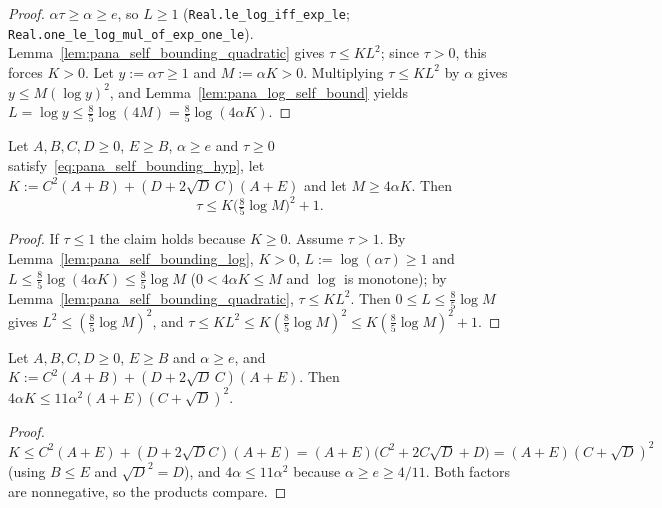 \begin{proof}
\leanok
$\alpha\tau \ge \alpha \ge e$, so $L \ge 1$ (\texttt{Real.le\_log\_iff\_exp\_le};
\texttt{Real.one\_le\_log\_mul\_of\_exp\_one\_le}). Lemma~\ref{lem:pana_self_bounding_quadratic}
gives $\tau \le KL^2$; since $\tau > 0$, this forces $K > 0$. Let $y := \alpha\tau \ge 1$ and
$M := \alpha K > 0$. Multiplying $\tau \le KL^2$ by $\alpha$ gives $y \le M(\log y)^2$, and
Lemma~\ref{lem:pana_log_self_bound} yields $L = \log y \le \frac85\log(4M) = \frac85\log(4\alpha K)$.
\end{proof}

\begin{lemma}\label{lem:pana_self_bounding_core}
\leanok
Let $A, B, C, D \ge 0$, $E \ge B$, $\alpha \ge e$ and $\tau \ge 0$
satisfy~\eqref{eq:pana_self_bounding_hyp}, let $K := C^2(A + B) + (D + 2\sqrt D\,C)(A + E)$ and
let $M \ge 4\alpha K$. Then
\[
  \tau \le K\Big(\tfrac85\log M\Big)^2 + 1 .
\]
\end{lemma}

\begin{proof}
\leanok
If $\tau \le 1$ the claim holds because $K \ge 0$. Assume $\tau > 1$. By
Lemma~\ref{lem:pana_self_bounding_log}, $K > 0$, $L := \log(\alpha\tau) \ge 1$ and
$L \le \frac85\log(4\alpha K) \le \frac85\log M$ ($0 < 4\alpha K \le M$ and $\log$ is monotone);
by Lemma~\ref{lem:pana_self_bounding_quadratic}, $\tau \le KL^2$.
Then $0 \le L \le \frac85\log M$ gives $L^2 \le (\frac85\log M)^2$, and
$\tau \le KL^2 \le K(\frac85\log M)^2 \le K(\frac85\log M)^2 + 1$.
\end{proof}

\begin{lemma}\label{lem:pana_four_alpha_K_le}
\leanok
Let $A, B, C, D \ge 0$, $E \ge B$ and $\alpha \ge e$, and $K := C^2(A + B) + (D + 2\sqrt D\,C)(A + E)$.
Then $4\alpha K \le 11\alpha^2(A + E)(C + \sqrt D)^2$.
\end{lemma}

\begin{proof}
\leanok
$K \le C^2(A+E) + (D + 2\sqrt D C)(A+E) = (A+E)\big(C^2 + 2C\sqrt D + D\big) = (A+E)(C + \sqrt D)^2$
(using $B \le E$ and $\sqrt D^2 = D$), and $4\alpha \le 11\alpha^2$ because $\alpha \ge e \ge 4/11$.
Both factors are nonnegative, so the products compare.
\end{proof}

